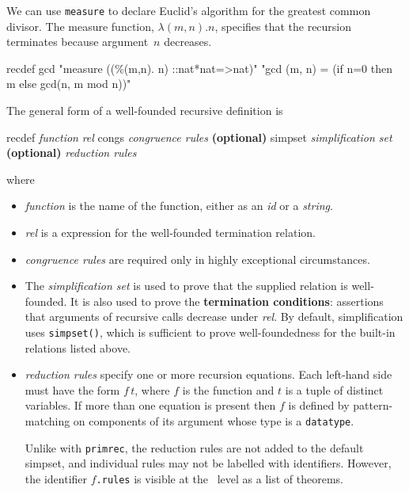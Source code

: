 We can use \texttt{measure} to declare Euclid's algorithm for the greatest
common divisor.  The measure function, $\lambda(m,n). n$, specifies that the
recursion terminates because argument~$n$ decreases.
\begin{ttbox}
recdef gcd "measure ((\%(m,n). n) ::nat*nat=>nat)"
    "gcd (m, n) = (if n=0 then m else gcd(n, m mod n))"
\end{ttbox}

The general form of a well-founded recursive definition is
\begin{ttbox}
recdef {\it function} {\it rel}
    congs   {\it congruence rules}      {\bf(optional)}
    simpset {\it simplification set}      {\bf(optional)}
   {\it reduction rules}
\end{ttbox}
where
\begin{itemize}
\item \textit{function} is the name of the function, either as an \textit{id}
  or a \textit{string}.  
  
\item \textit{rel} is a {\HOL} expression for the well-founded termination
  relation.
  
\item \textit{congruence rules} are required only in highly exceptional
  circumstances.
  
\item The \textit{simplification set} is used to prove that the supplied
  relation is well-founded.  It is also used to prove the \textbf{termination
    conditions}: assertions that arguments of recursive calls decrease under
  \textit{rel}.  By default, simplification uses \texttt{simpset()}, which
  is sufficient to prove well-foundedness for the built-in relations listed
  above. 
  
\item \textit{reduction rules} specify one or more recursion equations.  Each
  left-hand side must have the form $f\,t$, where $f$ is the function and $t$
  is a tuple of distinct variables.  If more than one equation is present then
  $f$ is defined by pattern-matching on components of its argument whose type
  is a \texttt{datatype}.  

  Unlike with \texttt{primrec}, the reduction rules are not added to the
  default simpset, and individual rules may not be labelled with identifiers.
  However, the identifier $f$\texttt{.rules} is visible at the \ML\ level
  as a list of theorems.
\end{itemize}

